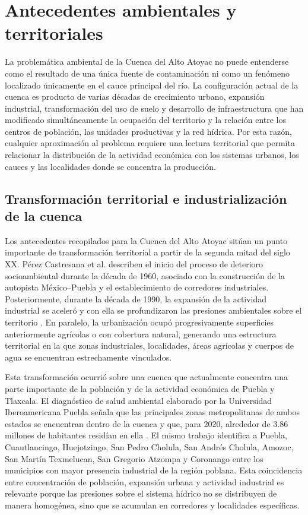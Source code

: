 \documentclass[11pt,letterpaper]{article}
\begin{document}
\section{Antecedentes ambientales y territoriales}
\label{sec:antecedentes}

La problemática ambiental de la Cuenca del Alto Atoyac no puede entenderse como el resultado de una única fuente de contaminación ni como un fenómeno localizado únicamente en el cauce principal del río. La configuración actual de la cuenca es producto de varias décadas de crecimiento urbano, expansión industrial, transformación del uso de suelo y desarrollo de infraestructura que han modificado simultáneamente la ocupación del territorio y la relación entre los centros de población, las unidades productivas y la red hídrica. Por esta razón, cualquier aproximación al problema requiere una lectura territorial que permita relacionar la distribución de la actividad económica con los sistemas urbanos, los cauces y las localidades donde se concentra la producción.

\subsection{Transformación territorial e industrialización de la cuenca}

Los antecedentes recopilados para la Cuenca del Alto Atoyac sitúan un punto importante de transformación territorial a partir de la segunda mitad del siglo XX. Pérez Castresana et al. describen el inicio del proceso de deterioro socioambiental durante la década de 1960, asociado con la construcción de la autopista México--Puebla y el establecimiento de corredores industriales. Posteriormente, durante la década de 1990, la expansión de la actividad industrial se aceleró y con ella se profundizaron las presiones ambientales sobre el territorio \cite{perezcastresana2023}. En paralelo, la urbanización ocupó progresivamente superficies anteriormente agrícolas o con cobertura natural, generando una estructura territorial en la que zonas industriales, localidades, áreas agrícolas y cuerpos de agua se encuentran estrechamente vinculados.

Esta transformación ocurrió sobre una cuenca que actualmente concentra una parte importante de la población y de la actividad económica de Puebla y Tlaxcala. El diagnóstico de salud ambiental elaborado por la Universidad Iberoamericana Puebla señala que las principales zonas metropolitanas de ambos estados se encuentran dentro de la cuenca y que, para 2020, alrededor de 3.86 millones de habitantes residían en ella \cite{perezcastresana2023}. El mismo trabajo identifica a Puebla, Cuautlancingo, Huejotzingo, San Pedro Cholula, San Andrés Cholula, Amozoc, San Martín Texmelucan, San Gregorio Atzompa y Coronango entre los municipios con mayor presencia industrial de la región poblana. Esta coincidencia entre concentración de población, expansión urbana y actividad industrial es relevante porque las presiones sobre el sistema hídrico no se distribuyen de manera homogénea, sino que se acumulan en corredores y localidades específicas.
\end{document}
